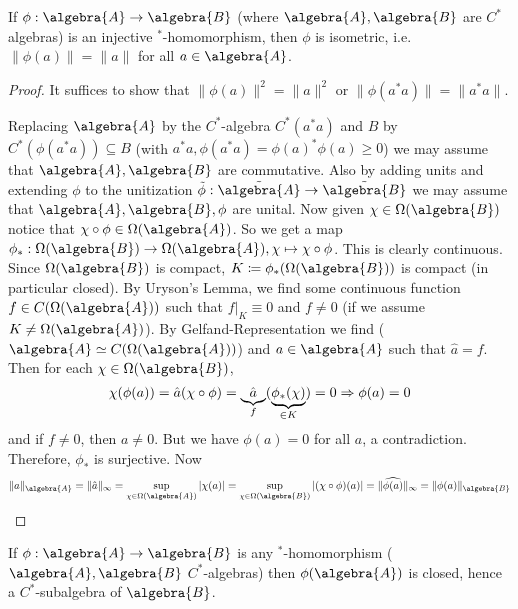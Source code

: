 \documentclass[a4paper]{article}
\begin{document}
\begin{theorem}
	If $\phi: \algebra{A} \to \algebra{B}$ (where $\algebra{A}, \algebra{B}$ are $C^*$ algebras) is an injective $^*$-homomorphism, then $\phi$ is isometric, i.e. $\|\phi(a)\| = \|a\|$ for all $a \in \algebra{A}$.
\end{theorem}

\begin{proof}
	It suffices to show that $\|\phi(a)\|^2 = \|a\|^2$ or $\|\phi(a^* a)\| = \|a^* a\|$.

	Replacing $\algebra{A}$ by the $C^*$-algebra $C^*(a^* a)$ and $B$ by $C^*(\phi(a^* a)) \subseteq B$ (with $a^*a, \phi(a^* a) = \phi(a)^* \phi(a) \geq 0$) we may assume that $\algebra{A}, \algebra{B}$ are commutative.
	Also by adding units and extending $\phi$ to the unitization $\tilde{\phi}: \tilde{\algebra{A}} \to \tilde{\algebra{B}}$ we may assume that $\algebra{A}, \algebra{B}, \phi$ are unital.
	Now given $\chi \in \Omega(\algebra{B})$ notice that $\chi \circ \phi \in \Omega(\algebra{A})$.
	So we get a map $\phi_*: \Omega(\algebra{B}) \to \Omega(\algebra{A}), \chi \mapsto \chi \circ \phi$. 
	This is clearly continuous. 
	Since $\Omega(\algebra{B})$ is compact, $K \coloneq \phi_*(\Omega(\algebra{B}))$ is compact (in particular closed).
	By Uryson's Lemma, we find some continuous function $f \in C(\Omega(\algebra{A}))$ such that $f|_K \equiv 0$ and $f \neq 0$ (if we assume $K \neq \Omega(\algebra{A})$).
	By Gelfand-Representation we find ($\algebra{A} \simeq C(\Omega(\algebra{A}))$) and $a \in \algebra{A}$ such that $\hat{a} = f$.
	Then for each $\chi \in \Omega(\algebra{B})$,
	\begin{equation*}
		\chi(\phi(a)) = \hat{a}(\chi \circ \phi) = \underbrace{\hat{a}}_{f} (\underbrace{\phi_*(\chi)}_{\in K}) = 0 \then \phi(a) = 0
	\end{equation*} 
	and if $f \neq 0$, then $a \neq 0$.
	But we have $\phi(a) = 0$ for all $a$, a contradiction. 
	Therefore, $\phi_*$ is surjective.
	Now
	\begin{align*}
		\|a\|_\algebra{A} = \|\hat{a}\|_\infty = \sup_{\chi \in \Omega(\algebra{A})} | \chi(a) | = \sup_{\chi \in \Omega(\algebra{B})} |(\chi \circ \phi) (a) | = \| \widehat{\phi(a)} \|_\infty = \| \phi(a) \|_\algebra{B}
	\end{align*}
\end{proof}

\begin{corollary}
	If $\phi: \algebra{A} \to \algebra{B}$ is any $^*$-homomorphism ($\algebra{A}, \algebra{B}$ $C^*$-algebras) then $\phi(\algebra{A})$ is closed, hence a $C^*$-subalgebra of $\algebra{B}$.
\end{corollary}
\end{document}
